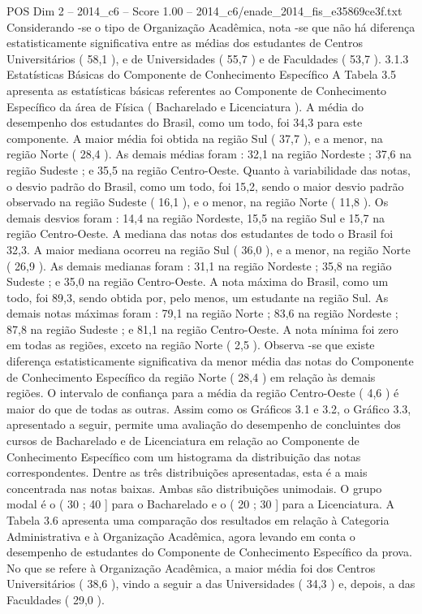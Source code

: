 \begin{textsample}{POS Dim 2 – 2014\_c6 – Score 1.00 – 2014\_c6/enade\_2014\_fis\_e35869ce3f.txt}
Considerando -se o tipo de Organização Acadêmica, nota -se que não há diferença estatisticamente significativa entre as médias dos estudantes de Centros Universitários ( 58,1 ), e de Universidades ( 55,7 ) e de Faculdades ( 53,7 ). 3.1.3 Estatísticas Básicas do Componente de Conhecimento Específico A Tabela 3.5 apresenta as estatísticas básicas referentes ao Componente de Conhecimento Específico da área de Física ( Bacharelado e Licenciatura ).
A média do desempenho dos estudantes do Brasil, como um todo, foi 34,3 para este componente.
A maior média foi obtida na região Sul ( 37,7 ), e a menor, na região Norte ( 28,4 ).
As demais médias foram : 32,1 na região Nordeste ; 37,6 na região Sudeste ; e 35,5 na região Centro-Oeste.
Quanto à variabilidade das notas, o desvio padrão do Brasil, como um todo, foi 15,2, sendo o maior desvio padrão observado na região Sudeste ( 16,1 ), e o menor, na região Norte ( 11,8 ).
Os demais desvios foram : 14,4 na região Nordeste, 15,5 na região Sul e 15,7 na região Centro-Oeste.
A mediana das notas dos estudantes de todo o Brasil foi 32,3.
A maior mediana ocorreu na região Sul ( 36,0 ), e a menor, na região Norte ( 26,9 ).
As demais medianas foram : 31,1 na região Nordeste ; 35,8 na região Sudeste ; e 35,0 na região Centro-Oeste.
A nota máxima do Brasil, como um todo, foi 89,3, sendo obtida por, pelo menos, um estudante na região Sul.
As demais notas máximas foram : 79,1 na região Norte ; 83,6 na região Nordeste ; 87,8 na região Sudeste ; e 81,1 na região Centro-Oeste.
A nota mínima foi zero em todas as regiões, exceto na região Norte ( 2,5 ).
Observa -se que existe diferença estatisticamente significativa da menor média das notas do Componente de Conhecimento Específico da região Norte ( 28,4 ) em relação às demais regiões.
O intervalo de confiança para a média da região Centro-Oeste ( 4,6 ) é maior do que de todas as outras.
Assim como os Gráficos 3.1 e 3.2, o Gráfico 3.3, apresentado a seguir, permite uma avaliação do desempenho de concluintes dos cursos de Bacharelado e de Licenciatura em relação ao Componente de Conhecimento Específico com um histograma da distribuição das notas correspondentes.
Dentre as três distribuições apresentadas, esta é a mais concentrada nas notas baixas.
Ambas são distribuições unimodais.
O grupo modal é o ( 30 ; 40 ] para o Bacharelado e o ( 20 ; 30 ] para a Licenciatura.
A Tabela 3.6 apresenta uma comparação dos resultados em relação à Categoria Administrativa e à Organização Acadêmica, agora levando em conta o desempenho de estudantes do Componente de Conhecimento Específico da prova.
No que se refere à Organização Acadêmica, a maior média foi dos Centros Universitários ( 38,6 ), vindo a seguir a das Universidades ( 34,3 ) e, depois, a das Faculdades ( 29,0 ).

\end{textsample}
